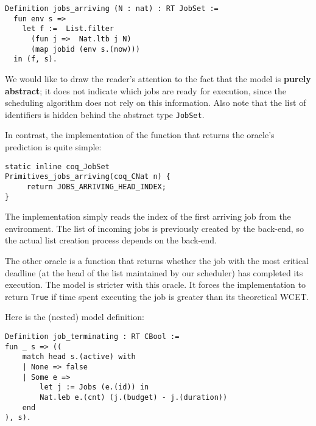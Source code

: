 	\begin{verbatim}
Definition jobs_arriving (N : nat) : RT JobSet :=
  fun env s =>
    let f :=  List.filter
      (fun j =>  Nat.ltb j N)
      (map jobid (env s.(now))) 
  in (f, s).
	\end{verbatim}

	We would like to draw the reader's attention to the fact that the model is \textbf{purely abstract}; it does not indicate which jobs are ready for execution, since the scheduling algorithm does not rely on this information. Also note that the list of identifiers is hidden behind the abstract type \texttt{JobSet}.

	In contrast, the implementation of the function that returns the oracle's prediction is quite simple:

	\begin{verbatim}
static inline coq_JobSet
Primitives_jobs_arriving(coq_CNat n) {
     return JOBS_ARRIVING_HEAD_INDEX;
}
	\end{verbatim}

	The implementation simply reads the index of the first arriving job from the environment. The list of incoming jobs is previously created by the back-end, so the actual list creation process depends on the back-end.

	The other oracle is a function that returns whether the job with the most critical deadline (at the head of the list maintained by our scheduler) has completed its execution. The model is stricter with this oracle. It forces the implementation to return \texttt{True} if time spent executing the job is greater than its theoretical WCET.

	\vspace{1cm}

	Here is the (nested) model definition:

	\begin{verbatim}
Definition job_terminating : RT CBool :=
fun _ s => ((
    match head s.(active) with
    | None => false
    | Some e =>
        let j := Jobs (e.(id)) in
        Nat.leb e.(cnt) (j.(budget) - j.(duration))
    end
), s).
	\end{verbatim}

